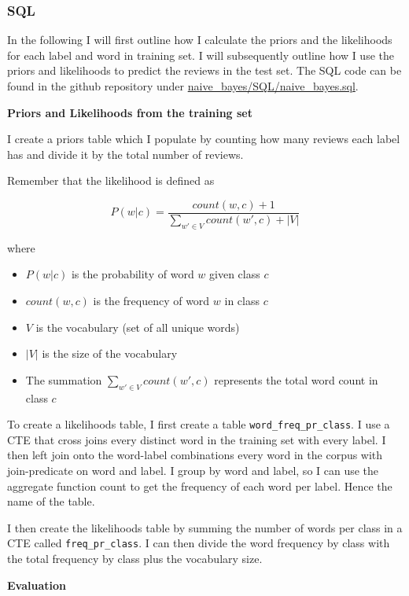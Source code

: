 \documentclass{article}
\begin{document}
\subsubsection{SQL}
In the following I will first outline how I calculate the priors and the likelihoods for each label and word in training set. I will subsequently outline how I use the priors and likelihoods to predict the reviews in the test set. The SQL code can be found in the github repository under \url{naive_bayes/SQL/naive_bayes.sql}.

\medskip\noindent \textbf{Priors and Likelihoods from the training set}

\smallskip \noindent I create a priors table which I populate by counting how many reviews each label has and divide it by the total number of reviews.


\medskip \noindent Remember that the likelihood is defined as 

$$P(w|c) = \frac{count(w,c) + 1}{\sum_{w' \in V} count(w',c) + |V|}$$

\noindent where 
\begin{itemize}
    \item $P(w|c)$ is the probability of word $w$ given class $c$
    \item $count(w,c)$ is the frequency of word $w$ in class $c$
    \item $V$ is the vocabulary (set of all unique words)
    \item $|V|$ is the size of the vocabulary
    \item The summation $\sum_{w' \in V} count(w',c)$ represents the total word count in class $c$
\end{itemize}


\medskip \noindent To create a likelihoods table, I first create a table \texttt{word\_freq\_pr\_class}. I use a CTE that cross joins every distinct word in the training set with every label. I then left join onto the word-label combinations every word in the corpus with join-predicate on word and label. I group by word and label, so I can use the aggregate function count to get the frequency of each word per label. Hence the name of the table. 

\medskip \noindent I then create the likelihoods table by summing the number of words per class in a CTE called \texttt{freq\_pr\_class}. I can then divide the word frequency by class with the total frequency by class plus the vocabulary size. 

\medskip\noindent \textbf{Evaluation}
\end{document}
